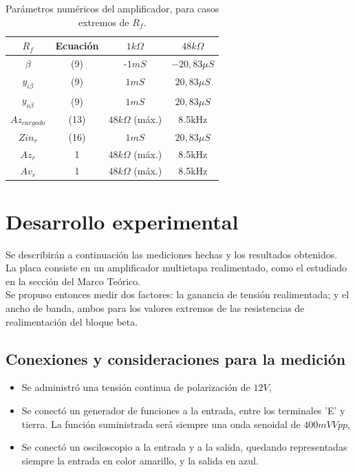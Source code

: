 \documentclass[letterpaper, 10 pt, conference]{ieeeconf}  %
\begin{document}
\begin{table}[h]
\begin{center}
\begin{tabular}{|c||c|c|c|}
\hline
$R_f$ & Ecuación & $1k\Omega$ & $48k\Omega$\\
\hline
$\beta$ & (9) & -$1 mS$ & $-20,83\mu S$\\
\hline
$y_{i\beta}$ & (9) & $1 mS$ & $20,83\mu S$\\
\hline
$y_{o\beta}$ & (9) & $1 mS$ & $20,83\mu S$\\
\hline
$Az_{cargado}$ & (13) & $48k\Omega$ (máx.) & 8.5kHz\\
\hline
$Zin_r$ & (16) & $1 mS$ & $20,83\mu S$\\
\hline
$Az_r$ & 1 & $48k\Omega$ (máx.) & 8.5kHz\\
\hline
$Av_r$ & 1 & $48k\Omega$ (máx.) & 8.5kHz\\
\hline
\end{tabular}
\end{center}
\caption{Parámetros numéricos del amplificador, para casos extremos de $R_f$.}
\label{tab:parametros}
\end{table}



\section{Desarrollo experimental}
Se describirán a continuación las mediciones hechas y los resultados obtenidos.\\
La placa consiste en un amplificador multietapa realimentado, como el estudiado en la sección del Marco Teórico.\\
Se propuso entonces medir dos factores: la ganancia de tensión realimentada; y el ancho de banda, ambos para los valores extremos de las resistencias de realimentación del bloque beta.

\subsection{Conexiones y consideraciones para la medición}

\begin{itemize}
  \item Se administró una tensión continua de polarización de $12V$,
  \item Se conectó un generador de funciones a la entrada, entre los terminales 'E' y tierra. La función suministrada será siempre una onda senoidal de $400mV Vpp$,
  \item Se conectó un osciloscopio a la entrada y a la salida, quedando representadas siempre la entrada en color amarillo, y la salida en azul.
\end{itemize}
\end{document}
